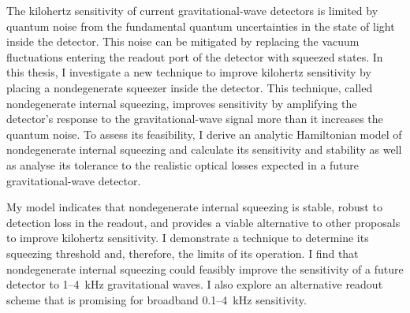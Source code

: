 The kilohertz sensitivity of current gravitational-wave detectors is limited by quantum noise from the fundamental quantum uncertainties in the state of light inside the detector. This noise can be mitigated by replacing the vacuum fluctuations entering the readout port of the detector with squeezed states.
In this thesis, I investigate a new technique to improve kilohertz sensitivity by placing a nondegenerate squeezer inside the detector. This technique, called nondegenerate internal squeezing, improves sensitivity by amplifying the detector's response to the gravitational-wave signal more than it increases the quantum noise.
To assess its feasibility, I derive an analytic Hamiltonian model of nondegenerate internal squeezing and calculate its sensitivity and stability as well as analyse its tolerance to the realistic optical losses expected in a future gravitational-wave detector.


My model indicates that nondegenerate internal squeezing is stable, robust to detection loss in the readout, and provides a viable alternative to other proposals to improve kilohertz sensitivity. %
I demonstrate a technique to determine its squeezing threshold and, therefore, the limits of its operation. 
I find that nondegenerate internal squeezing could feasibly improve the sensitivity of a future detector to 1--4~kHz gravitational waves. I also explore an alternative readout scheme that is promising for broadband 0.1--4~kHz sensitivity.


